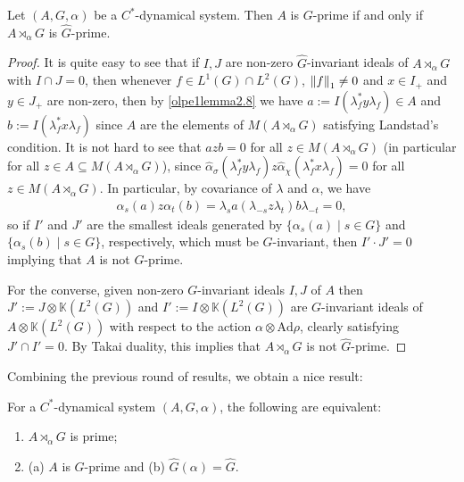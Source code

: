\begin{lemma}
	Let $(A, G, \alpha)$ be a $C^*$-dynamical system. Then $A$ is $G$-prime if and only if $A \rtimes_\alpha G$ is $\hat G$-prime.			
	\label{olpe1.5.7}
\end{lemma}
\begin{proof}
	It is quite easy to see that if $I,J$ are non-zero $\hat G$-invariant ideals of $A \rtimes_\alpha G$ with $I \cap J = 0$, then whenever $f \in L^1(G) \cap L^2(G)$, $\left\lVert f \right\rVert_1  \neq 0$ and $x \in I_+$ and $y \in J_+$ are non-zero, then by \cref{olpe1lemma2.8} we have $a := I(\lambda_f^* y \lambda_f) \in A$ and $b := I(\lambda_f^* x \lambda_f)$ since $A$ are the elements of $M(A \rtimes_\alpha G)$ satisfying Landstad's condition. It is not hard to see that $a z b = 0$ for all $z \in M(A \rtimes_\alpha G)$ (in particular for all $z \in A \subseteq M(A \rtimes_\alpha G)$), since $\hat \alpha_{\sigma}(\lambda_f^* y \lambda_f) z \hat \alpha_{\chi}(\lambda_f^* x \lambda_f) = 0$ for all $z \in M(A \rtimes_\alpha G)$. In particular, by covariance of $\lambda$ and $\alpha$, we have
	\begin{align*}
		\alpha_s(a) z \alpha_t(b) = \lambda_s a (\lambda_{-s} z \lambda_t) b \lambda_{-t}=0,
	\end{align*}
	so if $I'$ and $J'$ are the smallest ideals generated by $\{ \alpha_s(a) \mid s \in G\}$ and $\{ \alpha_s(b) \mid s \in G\}$, respectively, which must be $G$-invariant, then $I'\cdot J' = 0$ implying that $A$ is not $G$-prime.

	For the converse, given non-zero $G$-invariant ideals $I,J$ of $A$ then $J':=J \otimes \mathbb{K}(L^2(G))$ and $I':=I \otimes \mathbb{K}(L^2(G))$ are $G$-invariant ideals of $A \otimes \mathbb{K}(L^2(G))$ with respect to the action $\alpha \otimes \mathrm{Ad} \rho$, clearly satisfying $ J'\cap I' = 0$. By Takai duality, this implies that $A \rtimes_\alpha G$ is not $\hat G$-prime. 
\end{proof}
Combining the previous round of results, we obtain a nice result:
\begin{corollary}
	For a $C^*$-dynamical system $(A,G,\alpha)$, the following are equivalent:
	\begin{enumerate}
		\item $A \rtimes_\alpha G$ is prime;
		\item (a) $A$ is $G$-prime and (b) $\hat G(\alpha) = \hat G$.
	\end{enumerate}
	\label{olpe1.5.8}
\end{corollary}


